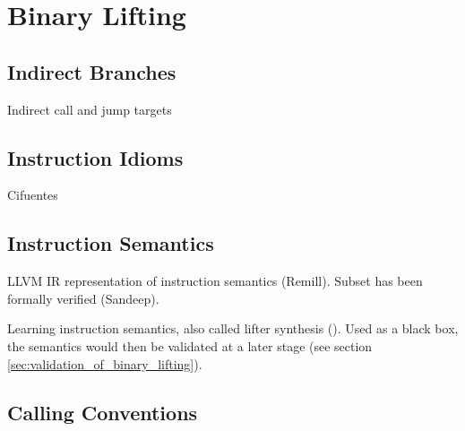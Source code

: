 

\section{Binary Lifting}


\subsection{Indirect Branches}

Indirect call and jump targets


\subsection{Instruction Idioms}

Cifuentes


\subsection{Instruction Semantics}

LLVM IR representation of instruction semantics (Remill). Subset has been formally verified (Sandeep).

Learning instruction semantics, also called lifter synthesis (\cite{lifter_synthesis}). Used as a black box, the semantics would then be validated at a later stage (see section \ref{sec:validation_of_binary_lifting}).



\subsection{Calling Conventions}

